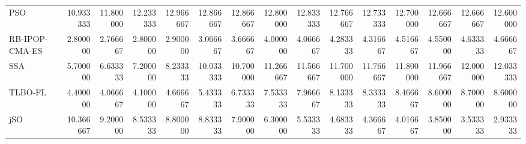 \begin{tabular}{lrrrrrrrrrrrrrr}
PSO            &  10.933333 &  11.800000 &  12.233333 &  12.966667 &  12.866667 &  12.866667 &  12.800000 &  12.833333 &  12.766667 &  12.733333 &  12.700000 &  12.666667 &  12.666667 &  12.600000 \\
RB-IPOP-CMA-ES &   2.800000 &   2.766667 &   2.800000 &   2.900000 &   3.066667 &   3.666667 &   4.000000 &   4.066667 &   4.283333 &   4.316667 &   4.516667 &   4.550000 &   4.633333 &   4.666667 \\
SSA            &   5.700000 &   6.633333 &   7.200000 &   8.233333 &  10.033333 &  10.700000 &  11.266667 &  11.566667 &  11.700000 &  11.766667 &  11.800000 &  11.966667 &  12.000000 &  12.033333 \\
TLBO-FL        &   4.400000 &   4.066667 &   4.100000 &   4.666667 &   5.433333 &   6.733333 &   7.533333 &   7.966667 &   8.133333 &   8.333333 &   8.466667 &   8.600000 &   8.700000 &   8.600000 \\
jSO            &  10.366667 &   9.200000 &   8.533333 &   8.800000 &   8.833333 &   7.900000 &   6.300000 &   5.533333 &   4.683333 &   4.366667 &   4.016667 &   3.850000 &   3.533333 &   2.933333 \\
\bottomrule
\end{tabular}
